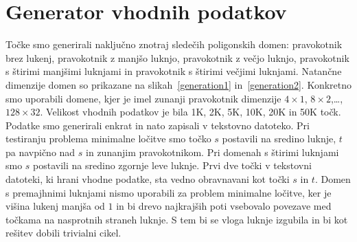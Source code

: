 \documentclass[a4paper, 12pt]{book}
\begin{document}
\section{Generator vhodnih podatkov}

Točke smo generirali naključno znotraj sledečih poligonskih domen: pravokotnik brez lukenj, pravokotnik z manjšo luknjo, pravokotnik z večjo luknjo, pravokotnik s štirimi manjšimi luknjami in pravokotnik s štirimi večjimi luknjami. Natančne dimenzije domen so prikazane na slikah~\ref{generation1} in~\ref{generation2}. Konkretno smo uporabili domene, kjer je imel zunanji pravokotnik dimenzije $4\times 1$, $8\times 2$,\ldots, $128\times 32$. Velikost vhodnih podatkov je bila 1K, 2K, 5K, 10K, 20K in 50K točk. Podatke smo generirali enkrat in nato zapisali v tekstovno datoteko. Pri testiranju problema minimalne ločitve smo točko $s$ postavili na sredino luknje, $t$ pa navpično nad $s$ in zunanjim pravokotnikom. Pri domenah s štirimi luknjami smo $s$ postavili na sredino zgornje leve luknje. Prvi dve točki v tekstovni datoteki, ki hrani vhodne podatke, sta vedno obravnavani kot točki $s$ in $t$. Domen s premajhnimi luknjami nismo uporabili za problem minimalne ločitve, ker je višina lukenj manjša od $1$ in bi drevo najkrajših poti vsebovalo povezave med točkama na nasprotnih straneh luknje. S tem bi se vloga luknje izgubila in bi kot rešitev dobili trivialni cikel.
\end{document}
